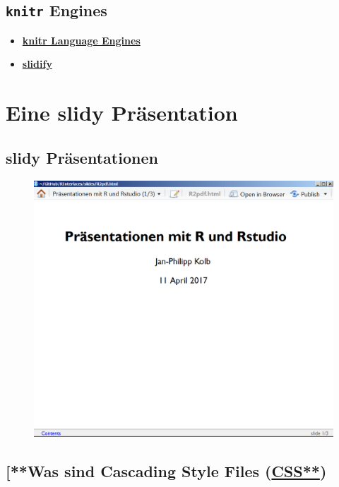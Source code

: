 \documentclass[]{article}
\begin{document}
\subsection{\texorpdfstring{\texttt{knitr}
Engines}{knitr Engines}}\label{knitr-engines}

\begin{itemize}
\item
  \href{http://rmarkdown.rstudio.com/authoring_knitr_engines.html}{\textbf{knitr
  Language Engines}}
\item
  \href{http://slidify.org/}{\textbf{slidify}}
\end{itemize}

\section{Eine slidy Präsentation}\label{eine-slidy-prasentation}

\subsection{slidy Präsentationen}\label{slidy-prasentationen}

\begin{figure}
\centering
\includegraphics{figure/sluidypresentations.PNG}
\caption{}
\end{figure}

\subsection{\texorpdfstring{{[}**Was sind Cascading Style Files
(\href{https://de.wikipedia.org/wiki/Cascading_Style_Sheets}{CSS**})}{{[}**Was sind Cascading Style Files (CSS**)}}\label{was-sind-cascading-style-files-css}
\end{document}
